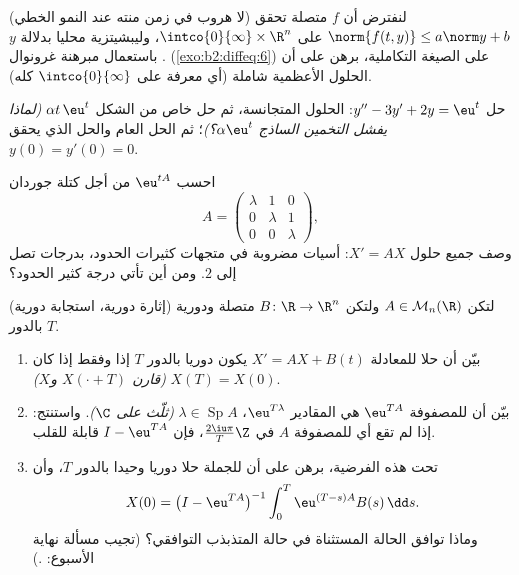 \begin{exercise}[$\star\star\star$]\label{exo:b2:diffeq:9}
(لا هروب في زمن منته عند النمو الخطي) لنفترض أن $f$ متصلة تحقق
$\norm{f(t, y)} \leq a\norm y + b$ على $\intco{0}{\infty} \times \R^n$، وليبشيتزية محليا بدلالة $y$. باستعمال مبرهنة
غرونوال (\cref{exo:b2:diffeq:6}) على الصيغة التكاملية، برهن على أن الحلول الأعظمية
شاملة (أي معرفة على $\intco{0}{\infty}$ كله).
\end{exercise}

\begin{exercise}[$\star$]\label{exo:b2:diffeq:10}
حل $y'' - 3y' + 2y = \eu^{t}$: الحلول المتجانسة، ثم حل خاص من الشكل $\alpha t\,\eu^{t}$
\emph{(لماذا يفشل التخمين الساذج $\alpha\eu^t$؟)}؛ ثم الحل العام والحل
الذي يحقق $y(0) = y'(0) = 0$.
\end{exercise}

\begin{exercise}[$\star\star$]\label{exo:b2:diffeq:11}
احسب $\eu^{tA}$ من أجل كتلة جوردان
\[
A = \begin{pmatrix} \lambda & 1 & 0\\ 0 & \lambda & 1\\
0 & 0 & \lambda\end{pmatrix},
\]
وصف جميع حلول $X' = AX$: أسيات مضروبة في متجهات كثيرات الحدود، بدرجات
تصل إلى $2$. ومن أين تأتي درجة كثير الحدود؟
\end{exercise}

\begin{exercise}[$\star\star\star$]\label{exo:b2:diffeq:12}
(إثارة دورية، استجابة دورية) لتكن $A \in
\mathcal{M}_n(\R)$ ولتكن $B \colon \R \to \R^n$ متصلة ودورية
بالدور $T$.
\begin{enumerate}
  \item بيّن أن حلا للمعادلة $X' = AX + B(t)$ يكون دوريا بالدور $T$ إذا
        وفقط إذا كان $X(T) = X(0)$
        \emph{(قارن $X(\cdot + T)$ و$X$)}.
  \item بيّن أن  للمصفوفة $\eu^{TA}$ هي المقادير
        $\eu^{T\lambda}$، $\lambda \in \operatorname{Sp}A$
        \emph{(ثلّث على $\C$)}. واستنتج: إذا لم تقع أي 
        للمصفوفة $A$ في $\frac{2\iu\pi}{T}\Z$، فإن
        $I - \eu^{TA}$ قابلة للقلب.
  \item تحت هذه الفرضية، برهن على أن للجملة حلا دوريا وحيدا بالدور
        $T$، وأن
        \[
        X(0) = \bigl(I - \eu^{TA}\bigr)^{-1}
        \int_0^{T}\eu^{(T-s)A}B(s)\,\dd s .
        \]
        وماذا توافق الحالة المستثناة في حالة المتذبذب التوافقي؟
        (تجيب مسألة نهاية الأسبوع: .)
\end{enumerate}
\end{exercise}

